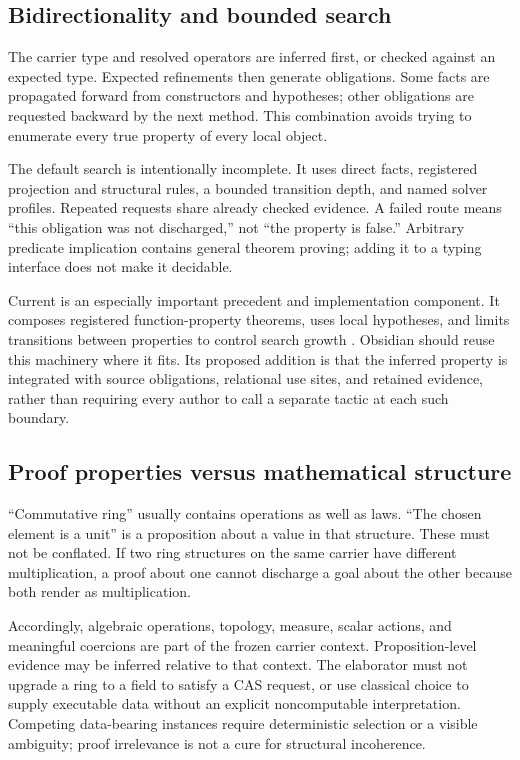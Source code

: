 \documentclass[11pt,a4paper]{article}
\newcommand{\code}[1]{\texttt{\detokenize{#1}}}
\theoremstyle{plain}\newtheorem{proposition}{Proposition}[section]
\theoremstyle{definition}\newtheorem{definition}[proposition]{Definition}
\theoremstyle{remark}\newtheorem{remark}[proposition]{Remark}
\begin{document}
\subsection{Bidirectionality and bounded search}
The carrier type and resolved operators are inferred first, or checked against an expected type. Expected refinements then generate obligations. Some facts are propagated forward from constructors and hypotheses; other obligations are requested backward by the next method. This combination avoids trying to enumerate every true property of every local object.

The default search is intentionally incomplete. It uses direct facts, registered projection and structural rules, a bounded transition depth, and named solver profiles. Repeated requests share already checked evidence. A failed route means ``this obligation was not discharged,'' not ``the property is false.'' Arbitrary predicate implication contains general theorem proving; adding it to a typing interface does not make it decidable.

Current \code{fun_prop} is an especially important precedent and implementation component. It composes registered function-property theorems, uses local hypotheses, and limits transitions between properties to control search growth \cite{funprop}. Obsidian should reuse this machinery where it fits. Its proposed addition is that the inferred property is integrated with source obligations, relational use sites, and retained evidence, rather than requiring every author to call a separate tactic at each such boundary.

\subsection{Proof properties versus mathematical structure}
``Commutative ring'' usually contains operations as well as laws. ``The chosen element is a unit'' is a proposition about a value in that structure. These must not be conflated. If two ring structures on the same carrier have different multiplication, a proof about one cannot discharge a goal about the other because both render as multiplication.

Accordingly, algebraic operations, topology, measure, scalar actions, and meaningful coercions are part of the frozen carrier context. Proposition-level evidence may be inferred relative to that context. The elaborator must not upgrade a ring to a field to satisfy a CAS request, or use classical choice to supply executable data without an explicit noncomputable interpretation. Competing data-bearing instances require deterministic selection or a visible ambiguity; proof irrelevance is not a cure for structural incoherence.
\end{document}
